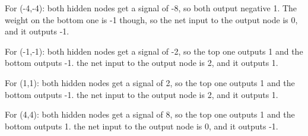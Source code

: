 \documentclass[12pt]{article}
\begin{document}
    For (-4,-4): both hidden nodes get a signal of -8, so both output negative 1. The weight on the bottom one is -1 though, 
    so the net input to the output node is 0, and it outputs -1. 
    
    For (-1,-1): both hidden nodes get a signal of -2, so the top one outputs 1 and the bottom outputs -1. 
    the net input to the output node is 2, and it outputs 1. 
    
    For (1,1): both hidden nodes get a signal of 2, so the top one outputs 1 and the bottom outputs -1. 
    the net input to the output node is 2, and it outputs 1. 
    
    For (4,4): both hidden nodes get a signal of 8, so the top one outputs 1 and the bottom outputs 1. 
    the net input to the output node is 0, and it outputs -1. 
\end{document}
